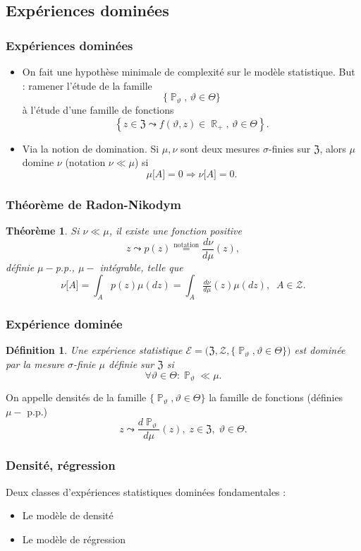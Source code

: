 ﻿\documentclass{beamer}
\newtheorem{theo}{Théorème}
\newtheorem{df}{Définition}
\DeclareMathOperator{\R}{{\mathbb R}}
\DeclareMathOperator{\PP}{{\mathbb P}}
\begin{document}
\subsection{Expériences dominées}
\begin{frame}
\frametitle{Expériences dominées}
\begin{itemize}
\item On fait une hypothèse minimale de \og complexité \fg{} sur le modèle statistique. {\color{red} But} : ramener l'étude de la famille
$$\{\PP_\vartheta,\,\vartheta \in \Theta\}$$
à l'étude d'une famille de fonctions
$$\left\{z \in \mathfrak{Z} \leadsto f(\vartheta,z) \in \R_+,\,\vartheta \in \Theta\right\}.$$
\item Via la notion de {\color{red} domination}. Si $\mu,\nu$ sont deux mesures $\sigma$-finies sur $\mathfrak{Z}$, alors $\mu$ {\color{red} domine} $\nu$ (notation $\nu \ll \mu$) si
$$\mu\big[A\big]=0 \Rightarrow \nu\big[A\big]=0.$$
\end{itemize}
\end{frame}
\begin{frame}
\frametitle{Théorème de Radon-Nikodym}
\begin{theo}
Si $\nu \ll \mu$, il existe une fonction positive
$$z \leadsto  p(z) \stackrel{\text{notation}}{=} \frac{d\nu}{d\mu}(z),$$ définie $\mu-$p.p., $\mu-$ intégrable, telle que
$$\nu\big[A\big] = \int_{A}p(z) \mu(dz) = \int_{A}\tfrac{d\nu}{d\mu}(z)\mu(dz),\;\;A \in {\mathcal Z}.$$
\end{theo}
\end{frame}
\begin{frame}
\frametitle{Expérience dominée}
\begin{df}
Une expérience statistique ${\mathcal E} = \big(\mathfrak{Z}, {\mathcal Z}, \big\{\PP_\vartheta, \vartheta \in \Theta\big\}\big)$ est {\color{red}dominée} par la mesure $\sigma$-finie $\mu$ définie sur $\mathfrak{Z}$ si
$$\forall \vartheta \in \Theta : \PP_\vartheta \ll \mu.$$
\end{df}
On appelle {\color{red} densités} de la famille $\{\PP_\vartheta,\vartheta \in \Theta\}$ la famille de fonctions (définies $\mu-$ p.p.)
$$z\leadsto \frac{d\PP_\vartheta}{d\mu}(z),\;z\in \mathfrak{Z},\;\vartheta \in \Theta.$$
\end{frame}

\begin{frame}
\frametitle{Densité, régression}
Deux classes d'expériences statistiques {\color{red}dominées} fondamentales :
\begin{itemize}
\item Le modèle de {\color{red} densité}
\item Le modèle de {\color{red}régression }
\end{itemize}
\end{frame}
\end{document}
